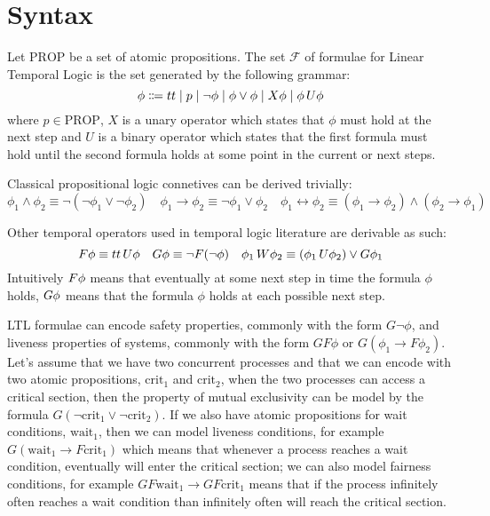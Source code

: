\section{Syntax}

\begin{definition}
  Let $\text{PROP}$ be a set of atomic propositions. The set $\mathcal{F}$ of formulae for Linear Temporal Logic is the
  set generated by the following grammar:
  \[
    \phi \Coloneqq tt \;|\; p
                      \;|\; \neg\phi
                      \;|\; \phi \lor \phi
                      \;|\; X{\phi}
                      \;|\; {\phi}\,U {\phi}
  \]
  where $p \in \text{PROP}$, $X$ is a unary operator which states that $\phi$ must hold at the next step and $U$ is a
  binary operator which states that the first formula must hold until the second formula holds at some point in the
  current or next steps.
\end{definition}

Classical propositional logic connetives can be derived trivially:
\[
  \phi_1 \land \phi_2 \equiv \neg(\neg\phi_1 \lor \neg\phi_2) \quad
  \phi_1 \to \phi_2 \equiv \neg\phi_1 \lor \phi_2 \quad
  \phi_1 \leftrightarrow \phi_2 \equiv (\phi_1 \to \phi_2) \land (\phi_2 \to \phi_1)
\]

Other temporal operators used in temporal logic literature are derivable as such:
\[
  F{\phi} \equiv {tt}\,U {\phi} \quad
  G{\phi} \equiv \neg F{(}\neg\phi) \quad
  {\phi_1}\,W {\phi_2} \equiv ({\phi_1}\,U {\phi_2}) \lor G{\phi_1}
\]
Intuitively $F{\phi}$ means that eventually at some next step in time the formula $\phi$ holds,
$G{\phi}$ means that the formula $\phi$ holds at each possible next step.

LTL formulae can encode safety properties, commonly with the form $G\neg\phi$, and liveness properties of systems,
commonly with the form $GF\phi$ or $G(\phi_1 \to F\phi_2)$. Let's assume that we have two concurrent processes and that
we can encode with two atomic propositions, $\text{crit}_1$ and $\text{crit}_2$, when the two processes can access a
critical section, then the property of mutual exclusivity can be model by the formula $G(\neg\text{crit}_1 \lor
\neg\text{crit}_2)$. If we also have atomic propositions for wait conditions, $\text{wait}_1$, then we can model
liveness conditions, for example $G(\text{wait}_1 \to F\text{crit}_1)$ which means that whenever a process reaches a
wait condition, eventually will enter the critical section; we can also model fairness conditions, for example
$GF\text{wait}_1 \to GF\text{crit}_1$ means that if the process infinitely often reaches a wait condition than
infinitely often will reach the critical section.


